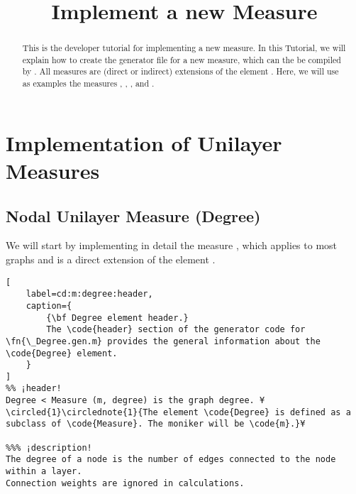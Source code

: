 \documentclass{tufte-handout}
\title{Implement a new Measure}
\begin{document}
\maketitle

\begin{abstract}
\noindent
This is the developer tutorial for implementing a new measure. 
In this Tutorial, we will explain how to create the generator file  for a new measure, which can the be compiled by . All measures are (direct or indirect) extensions of the element . Here, we will use as examples the measures , , , and .
\end{abstract}

\tableofcontents

\clearpage
\section{Implementation of Unilayer Measures}

\subsection{Nodal Unilayer Measure (Degree)}

We will start by implementing in detail the measure , which applies to most graphs and is a direct extension of the element .

\begin{lstlisting}[
	label=cd:m:degree:header,
	caption={
		{\bf Degree element header.}
		The \code{header} section of the generator code for \fn{\_Degree.gen.m} provides the general information about the \code{Degree} element.
	}
]
%% ¡header!
Degree < Measure (m, degree) is the graph degree. ¥\circled{1}\circlednote{1}{The element \code{Degree} is defined as a subclass of \code{Measure}. The moniker will be \code{m}.}¥

%%% ¡description!
The degree of a node is the number of edges connected to the node within a layer. 
Connection weights are ignored in calculations.
\end{lstlisting}
\end{document}
